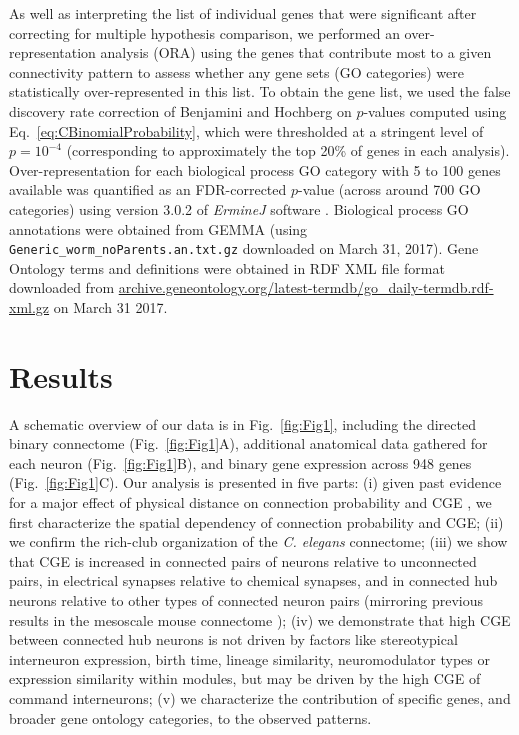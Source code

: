 \documentclass[10pt,letterpaper]{article}
\begin{document}
As well as interpreting the list of individual genes that were significant after correcting for multiple hypothesis comparison, we performed an over-representation analysis (ORA) using the genes that contribute most to a given connectivity pattern to assess whether any gene sets (GO categories) were statistically over-represented in this list.
To obtain the gene list, we used the false discovery rate correction of Benjamini and Hochberg \cite{Benjamini:1995cd} on $p$-values computed using Eq.~\eqref{eq:CBinomialProbability}, which were thresholded at a stringent level of $p = 10^{-4}$ (corresponding to approximately the top 20\% of genes in each analysis).
Over-representation for each biological process GO category with 5 to 100 genes available was quantified as an FDR-corrected $p$-value (across around 700 GO categories) using version 3.0.2 of \emph{ErmineJ} software \cite{Gillis2010}.
Biological process GO annotations \cite{Ashburner2000} were obtained from GEMMA \cite{Zoubarev2012} (using \texttt{Generic\_worm\_noParents.an.txt.gz} downloaded on March 31, 2017).
Gene Ontology terms and definitions were obtained in RDF XML file format downloaded from \url{archive.geneontology.org/latest-termdb/go_daily-termdb.rdf-xml.gz} on March 31 2017.

\section*{Results}

A schematic overview of our data is in Fig.~\ref{fig:Fig1}, including
the directed binary connectome (Fig.~\ref{fig:Fig1}A),
additional anatomical data gathered for each neuron (Fig.~\ref{fig:Fig1}B),
and binary gene expression across 948 genes (Fig.~\ref{fig:Fig1}C).
Our analysis is presented in five parts:
(i) given past evidence for a major effect of physical distance on connection probability and CGE \cite{Fulcher:2016ck}, we first characterize the spatial dependency of connection probability and CGE;
(ii) we confirm the rich-club organization of the \emph{C. elegans} connectome;
(iii) we show that CGE is increased in connected pairs of neurons relative to unconnected pairs, in electrical synapses relative to chemical synapses, and in connected hub neurons relative to other types of connected neuron pairs (mirroring previous results in the mesoscale mouse connectome \cite{Fulcher:2016ck});
(iv) we demonstrate that high CGE between connected hub neurons is not driven by factors like stereotypical interneuron expression, birth time, lineage similarity, neuromodulator types or expression similarity within modules, but may be driven by the high CGE of command interneurons;
(v) we characterize the contribution of specific genes, and broader gene ontology categories, to the observed patterns.
\end{document}
